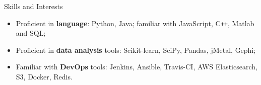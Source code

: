 \documentclass{resume} %
\newenvironment{myitemize}
{ \begin{itemize}[leftmargin=0.2em,label={}]
    \setlength{\itemsep}{0pt}
    \setlength{\parskip}{0pt}
    \setlength{\parsep}{0pt}     }
{ \end{itemize}                  }
\begin{document}
\begin{rSection}{Skills and Interests}
\begin{myitemize}\setlength\itemsep{0.1em}
    \item Proficient in \textbf{language}: Python, Java; familiar with JavaScript, C\texttt{++}, Matlab and SQL;
    \item Proficient in \textbf{data analysis} tools: Scikit-learn, SciPy, Pandas, jMetal, Gephi;
    \item Familiar with \textbf{DevOps} tools: Jenkins, Ansible, Travis-CI, AWS Elasticsearch, S3, Docker, Redis.
\end{myitemize}


\end{rSection}

\end{document}

